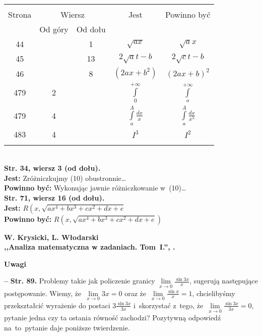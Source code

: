 \documentclass[a4paper,11pt]{article}
\newcommand{\spaceOne}{2em}
\newcommand{\fr}{\frac}
\newcommand{\ld}{\ldots}
\newcommand{\ra}{\rightarrow}
\newcommand{\sq}{\sqrt}
\newcommand{\Lim}{\lim\limits}
\newcommand{\IntL}{\int\limits}
\newcommand{\la}{\uplambda}
\newcommand{\tb}{\textbf}
\newcommand{\noi}{\noindent}
\newcommand{\start}{\noi \tb{--} {}}
\newcommand{\Center}[1]{\begin{center} #1 \end{center}}
\newcommand{\CenterTB}[1]{\Center{\tb{#1}}}
\newcommand{\Str}[1]{\tb{Str. #1.}}
\newcommand{\StrWd}[2]{\tb{Str. #1, wiersz #2 (od dołu).} \\}
\newcommand{\Jest}{\tb{Jest: }}
\newcommand{\Pow}{\tb{Powinno być: }}
\newcommand{\Work}[1]{ \begin{center} {\large \tb{#1} } \end{center} }
\begin{document}
\begin{center}
  \begin{tabular}{|c|c|c|c|c|}
    \hline
    & \multicolumn{2}{c|}{} & & \\
    Strona & \multicolumn{2}{c|}{Wiersz}& Jest
                              & Powinno być \\ \cline{2-3}
    & Od góry & Od dołu &  &  \\ \hline
    44 & & 1 & $\sq{ ax }$ & $\sq{ a } x$ \\
    45 & & 13 & $2 \sq{ a } t - b$ & $2 \sq{ c } t - b$ \\
    46 & & 8 & $( 2 ax + b^{ 2 } )$ & $( 2 ax + b )^{ 2 }$ \\
    479 & 2 & & $\IntL_{ 0 }^{ +\infty }$
           & $\IntL_{ a }^{ +\infty }$ \\
    479 & 4 & & $\IntL_{ a }^{ A } \fr{ dx }{ x }$
           & $\IntL_{ a }^{ A } \fr{ dx }{ x^{ \la } }$ \\
    483 & 4 & & $I^{ 3 }$ & $I^{ 2 }$ \\
    & & & & \\ \hline
  \end{tabular}
\end{center}

\vspace{1em}

\noi \\
\StrWd{34}{3}
\tb{Jest:} Zróżniczkujmy (10) obustronnie\ld \\
\tb{Powinno być:} Wykonując jawnie różniczkowanie w~(10)\ld \\
\StrWd{71}{16} \Jest
$R\left( x, \sq{ ax^{ 4 } + bx^{ 3 } + cx^{ 2 } + dx + e }
\right.$ \\
\Pow $R\left( x, \sq{ ax^{ 4 } + bx^{ 3 } + cx^{ 2 } + dx + e }
\right)$ \\

\vspace{\spaceOne}



\Work{
  W. Krysicki, L. Włodarski \\
  ,,Analiza matematyczna w zadaniach. Tom~I.'', \cite{KW05}.}


\CenterTB{Uwagi}

\start \Str{89} Problemy takie jak policzenie granicy
$\Lim_{ x \ra 0 } \fr{ \sin 3 x }{ x }$, sugerują następujące
postępowanie. Wiemy, że~$\Lim_{ x \ra 0 } 3x = 0$ oraz
że~$\Lim_{ x \ra 0 } \fr{ \sin x }{ x } = 1$, chcielibyśmy
przekształcić wyrażenie do postaci $3 \fr{ \sin 3x }{ 3x }$
i~skorzystać z~tego, że~$\Lim_{ x \ra 0 } \fr{ \sin 3x }{ 3x } = 0$,
pytanie jedna czy ta ostania równość zachodzi? Pozytywną odpowiedź
na~to~pytanie daje poniższe twierdzenie.
\end{document}
